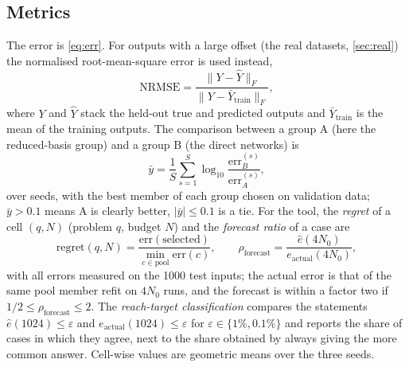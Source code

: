 \subsection{Metrics}
The error is \eqref{eq:err}. For outputs with a large offset (the real datasets, \cref{sec:real}) the normalised root-mean-square error is used instead,
\begin{equation}\label{eq:nrmse}\mathrm{NRMSE}=\frac{\lVert Y-\hat Y\rVert_F}{\lVert Y-\bar Y_{\mathrm{train}}\rVert_F},\end{equation}
where $Y$ and $\hat Y$ stack the held-out true and predicted outputs and $\bar Y_{\mathrm{train}}$ is the mean of the training outputs. The comparison between a group A (here the reduced-basis group) and a group B (the direct networks) is
\begin{equation}\label{eq:y}\bar y=\frac1S\sum_{s=1}^S\log_{10}\frac{\mathrm{err}_B^{(s)}}{\mathrm{err}_A^{(s)}},\end{equation}
over seeds, with the best member of each group chosen on validation data; $\bar y>0.1$ means A is clearly better, $|\bar y|\le0.1$ is a tie. For the tool, the \emph{regret} of a cell $(q,N)$ (problem $q$, budget $N$) and the \emph{forecast ratio} of a case are
\begin{equation}\label{eq:regret}\mathrm{regret}(q,N)=\frac{\mathrm{err}(\text{selected})}{\min_{c\in\text{pool}}\mathrm{err}(c)},\qquad
\rho_{\mathrm{forecast}}=\frac{\hat e(4N_0)}{e_{\mathrm{actual}}(4N_0)},\end{equation}
with all errors measured on the 1000 test inputs; the actual error is that of the same pool member refit on $4N_0$ runs, and the forecast is within a factor two if $1/2\le\rho_{\mathrm{forecast}}\le2$. The \emph{reach-target classification} compares the statements $\hat e(1024)\le\varepsilon$ and $e_{\mathrm{actual}}(1024)\le\varepsilon$ for $\varepsilon\in\{1\%,0.1\%\}$ and reports the share of cases in which they agree, next to the share obtained by always giving the more common answer. Cell-wise values are geometric means over the three seeds.

